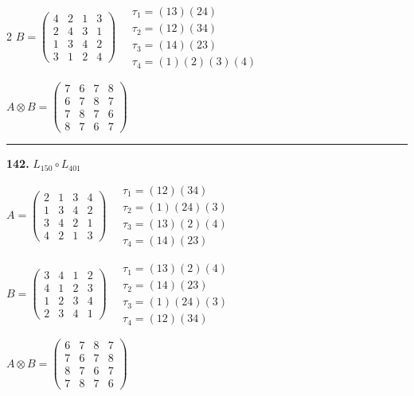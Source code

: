 \begin{multicols}{2}
$B = \begin{pmatrix} 4 & 2 & 1 & 3 \\ 2 & 4 & 3 & 1 \\ 1 & 3 & 4 & 2 \\ 3 & 1 & 2 & 4 \end{pmatrix} \quad \begin{matrix} \tau_{1}=(1 3)(2 4) \\ \tau_{2}=(1 2)(3 4) \\ \tau_{3}=(1 4)(2 3) \\ \tau_{4}=(1)(2)(3)(4) \end{matrix}$

$A \otimes B = \begin{pmatrix} 7 & 6 & 7 & 8 \\ 6 & 7 & 8 & 7 \\ 7 & 8 & 7 & 6 \\ 8 & 7 & 6 & 7 \end{pmatrix}$

\vspace{0.3em}
\hrule
\vspace{0.3em}

\noindent\textbf{142.} $L_{150} \circ L_{401}$

$A = \begin{pmatrix} 2 & 1 & 3 & 4 \\ 1 & 3 & 4 & 2 \\ 3 & 4 & 2 & 1 \\ 4 & 2 & 1 & 3 \end{pmatrix} \quad \begin{matrix} \tau_{1}=(1 2)(3 4) \\ \tau_{2}=(1)(2 4)(3) \\ \tau_{3}=(1 3)(2)(4) \\ \tau_{4}=(1 4)(2 3) \end{matrix}$

$B = \begin{pmatrix} 3 & 4 & 1 & 2 \\ 4 & 1 & 2 & 3 \\ 1 & 2 & 3 & 4 \\ 2 & 3 & 4 & 1 \end{pmatrix} \quad \begin{matrix} \tau_{1}=(1 3)(2)(4) \\ \tau_{2}=(1 4)(2 3) \\ \tau_{3}=(1)(2 4)(3) \\ \tau_{4}=(1 2)(3 4) \end{matrix}$

$A \otimes B = \begin{pmatrix} 6 & 7 & 8 & 7 \\ 7 & 6 & 7 & 8 \\ 8 & 7 & 6 & 7 \\ 7 & 8 & 7 & 6 \end{pmatrix}$


\end{multicols}
